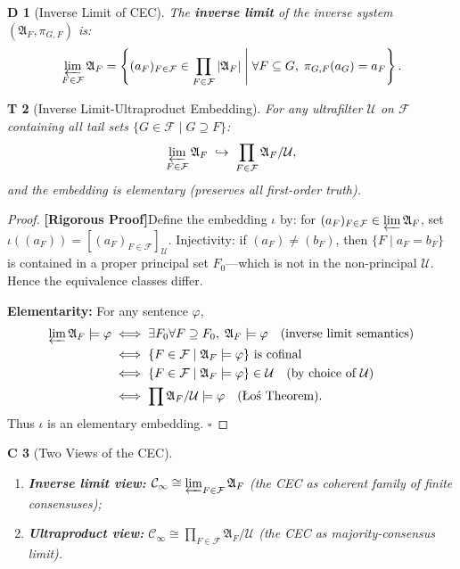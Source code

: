 \documentclass[12pt,a4paper]{article}
\newtheorem{theorem}Theorem[section]
\newtheorem{corollary}[theorem]Corollary
\newtheorem{definition}[theorem]Definition
\theoremstyle{remark}
\newcommand{\CEC}{\mathcal{C}}
\newcommand{\Ultrafilter}{\mathcal{U}}
\newcommand{\Struct}{\mathfrak{A}}
\newcommand{\rigorous}{\textnormal{\textbf{[Rigorous Proof]}}}
\begin{document}
\begin{definition}[Inverse Limit of CEC]
The \textbf{inverse limit} of the inverse system \((\Struct_F, \pi_{G,F})\) is:
\begin{equation}
    \varprojlim_{F \in \mathcal{F}} \Struct_F
    = \left\{ (a_F)_{F \in \mathcal{F}} \in \prod_{F \in \mathcal{F}} |\Struct_F|
    \;\middle|\; \forall F \subseteq G,\; \pi_{G,F}(a_G) = a_F \right\}.
\end{equation}
\end{definition}

\begin{theorem}[Inverse Limit-Ultraproduct Embedding]\label{thm:invlim_ultra}
For any ultrafilter \(\Ultrafilter\) on \(\mathcal{F}\) containing all tail sets \(\{G \in \mathcal{F} \mid G \supseteq F\}\):
\begin{equation}\label{eq:embedding}
    \varprojlim_{F \in \mathcal{F}} \Struct_F \;\hookrightarrow\; \prod_{F \in \mathcal{F}} \Struct_F / \Ultrafilter,
\end{equation}
and the embedding is elementary (preserves all first-order truth).
\end{theorem}
\begin{proof}
\rigorous Define the embedding \(\iota\) by: for \((a_F)_{F \in \mathcal{F}} \in \varprojlim \Struct_F\), set \(\iota((a_F)) = [(a_F)_{F \in \mathcal{F}}]_{\Ultrafilter}\). Injectivity: if \((a_F) \neq (b_F)\), then \(\{F \mid a_F = b_F\}\) is contained in a proper principal set \(F_0\)---which is not in the non-principal \(\Ultrafilter\). Hence the equivalence classes differ.

\textbf{Elementarity:} For any sentence \(\varphi\),
\begin{align*}
    \varprojlim \Struct_F \models \varphi
    &\iff \exists F_0 \forall F \supseteq F_0,\; \Struct_F \models \varphi
    \quad\text{(inverse limit semantics)}\\
    &\iff \{F \in \mathcal{F} \mid \Struct_F \models \varphi\} \text{ is cofinal}\\
    &\iff \{F \in \mathcal{F} \mid \Struct_F \models \varphi\} \in \Ultrafilter
    \quad\text{(by choice of }\Ultrafilter\text{)}\\
    &\iff \prod \Struct_F / \Ultrafilter \models \varphi
    \quad\text{(Łoś Theorem)}.
\end{align*}
Thus \(\iota\) is an elementary embedding. \(\square\)
\end{proof}

\begin{corollary}[Two Views of the CEC]
\begin{enumerate}[label=(\arabic*),itemsep=3pt]
    \item \textbf{Inverse limit view:} \(\CEC_{\infty} \cong \varprojlim_{F \in \mathcal{F}} \Struct_F\) (the CEC as coherent family of finite consensuses);
    \item \textbf{Ultraproduct view:} \(\CEC_{\infty} \cong \prod_{F \in \mathcal{F}} \Struct_F / \Ultrafilter\) (the CEC as majority-consensus limit).
\end{enumerate}
\end{corollary}
\end{document}
